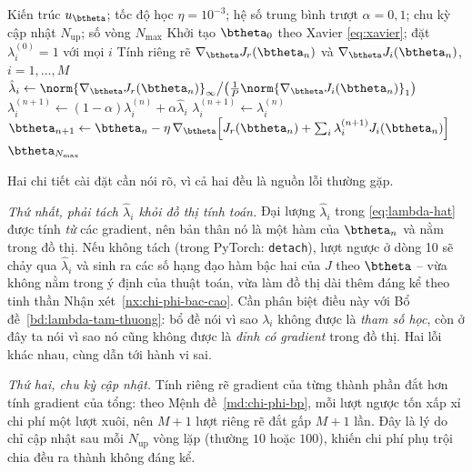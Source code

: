\begin{algorithm}[htbp]
\caption{Huấn luyện PINNs với cân bằng tốc độ học thích nghi}
\label{alg:annealing}
\begin{algorithmic}[1]
\Require Kiến trúc $u_{\btheta}$; tốc độ học $\eta = 10^{-3}$; hệ số trung bình
  trượt $\alpha = 0{,}1$; chu kỳ cập nhật $N_{\text{up}}$; số vòng $N_{\max}$
\State Khởi tạo $\btheta_{0}$ theo Xavier \eqref{eq:xavier}; đặt
  $\lambda_{i}^{(0)} = 1$ với mọi $i$
    \State Tính riêng rẽ $\nabla_{\btheta}J_{r}(\btheta_{n})$ và
           $\nabla_{\btheta}J_{i}(\btheta_{n})$, $i=1,\dots,M$
    \State $\hat{\lambda}_{i} \gets
           \norm{\nabla_{\btheta}J_{r}(\btheta_{n})}_{\infty}
           \big/ \big(\tfrac{1}{P}\norm{\nabla_{\btheta}J_{i}
           (\btheta_{n})}_{1}\big)$
    \State $\lambda_{i}^{(n+1)} \gets
           (1-\alpha)\lambda_{i}^{(n)} + \alpha\hat{\lambda}_{i}$
  \Else
    \State $\lambda_{i}^{(n+1)} \gets \lambda_{i}^{(n)}$
  \EndIf
  \State $\btheta_{n+1} \gets \btheta_{n} - \eta\,\nabla_{\btheta}
         \Big[J_{r}(\btheta_{n})
         + \sum_{i} \lambda_{i}^{(n+1)} J_{i}(\btheta_{n})\Big]$
\EndFor
\State \Return $\btheta_{N_{\max}}$
\end{algorithmic}
\end{algorithm}
 
Hai chi tiết cài đặt cần nói rõ, vì cả hai đều là nguồn lỗi thường gặp.
 
\emph{Thứ nhất, phải tách $\hat\lambda_i$ khỏi đồ thị tính toán.} Đại lượng
$\hat{\lambda}_{i}$ trong \eqref{eq:lambda-hat} được tính \emph{từ} các gradient,
nên bản thân nó là một hàm của $\btheta_n$ và nằm trong đồ thị. Nếu không tách
(trong PyTorch: \texttt{detach}), lượt ngược ở dòng 10 sẽ chảy qua $\hat\lambda_i$
và sinh ra các số hạng đạo hàm bậc hai của $J$ theo $\btheta$ -- vừa không nằm
trong ý định của thuật toán, vừa làm đồ thị dài thêm đáng kể theo tinh thần
Nhận xét~\ref{nx:chi-phi-bac-cao}. Cần phân biệt điều này với
Bổ đề~\ref{bd:lambda-tam-thuong}: bổ đề nói vì sao $\lambda_i$ không được là
\emph{tham số học}, còn ở đây ta nói vì sao nó cũng không được là \emph{đỉnh có
gradient} trong đồ thị. Hai lỗi khác nhau, cùng dẫn tới hành vi sai.
 
\emph{Thứ hai, chu kỳ cập nhật.} Tính riêng rẽ gradient của từng thành phần đắt
hơn tính gradient của tổng: theo Mệnh đề~\ref{md:chi-phi-bp}, mỗi lượt ngược tốn
xấp xỉ chi phí một lượt xuôi, nên $M+1$ lượt riêng rẽ đắt gấp $M+1$ lần. Đây là
lý do chỉ cập nhật sau mỗi $N_{\text{up}}$ vòng lặp (thường $10$ hoặc $100$),
khiến chi phí phụ trội chia đều ra thành không đáng kể.
 
